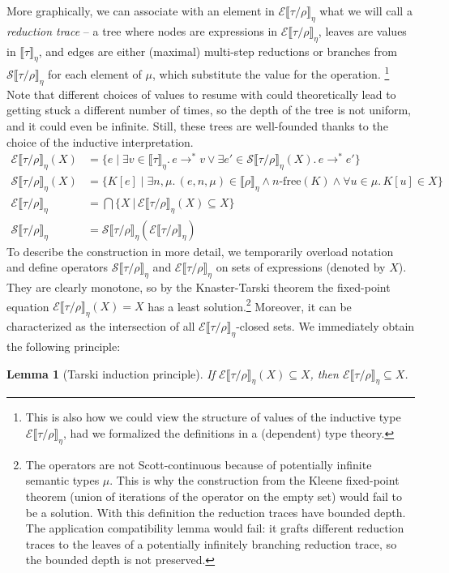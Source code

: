 \documentclass[a4paper, 12pt]{report}
\newcommand{\E}{\mathcal{E}}
\renewcommand{\S}{\mathcal{S}}
\newcommand{\Free}{\textrm{-}\mathrm{free}}
\newcommand{\+}{\enspace}
\newtheorem{lemma}{Lemma}
\begin{document}
More graphically,
we can associate with an element in $\E⟦τ/ρ⟧_η$ what we will call a {\em reduction trace}
– a tree where nodes are expressions in $\E⟦τ/ρ⟧_η$,
leaves are values in $⟦τ⟧_η$, and edges are either (maximal) multi-step reductions
or branches from $\S⟦τ/ρ⟧_η$ for each element of $μ$,
which substitute the value for the operation.%
\footnote{
	This is also how we could view the structure of values of the inductive type $\E⟦τ/ρ⟧_η$,
	had we formalized the definitions in a (dependent) type theory.
}
Note that different choices of values to resume with could
theoretically lead to getting stuck a different number of times,
so the depth of the tree is not uniform, and it could even be infinite.
Still, these trees are well-founded thanks to the choice of the inductive interpretation.
\begin{align*}
	\E⟦τ/ρ⟧_η(X) &=
	\{ e \mid ∃v∈⟦τ⟧_η.\, e →^* v ∨ ∃e'∈\S⟦τ/ρ⟧_η(X).\, e →^* e' \} \\
	\S⟦τ/ρ⟧_η(X) &= \{ K[e] \mid ∃n,μ.\, (e,n,μ)∈⟦ρ⟧_η  ∧ n\Free(K) ∧ ∀u∈μ.\, K[u]∈X \} \\
	\E⟦τ/ρ⟧_η &= \bigcap \{ X │ \E⟦τ/ρ⟧_η(X) ⊆ X \} \\
	\S⟦τ/ρ⟧_η &= \S⟦τ/ρ⟧_η(\E⟦τ/ρ⟧_η)
\end{align*} \indent
To describe the construction in more detail, we temporarily overload notation and define
operators $\S⟦τ/ρ⟧_η$ and $\E⟦τ/ρ⟧_η$ on sets of expressions (denoted by $X$).
They are clearly monotone,
so by the Knaster-Tarski theorem %
the fixed-point equation $\E⟦τ/ρ⟧_η(X) = X$ has a least solution.\footnote{
	The operators are not Scott-continuous because of potentially infinite semantic
	types $μ$.
	This is why the construction from the Kleene fixed-point theorem (union of
	iterations of the operator on the empty set)
	would fail to be a solution.
	With this definition the reduction traces have bounded depth.
	The application compatibility lemma would fail:
	it grafts different reduction traces to the leaves of a
	potentially infinitely branching reduction trace,
	so the bounded depth is not preserved.
}
Moreover, it can be characterized as the intersection of all
$\E⟦τ/ρ⟧_η$-closed sets.
We immediately obtain the following principle:

\begin{lemma}[Tarski induction principle]\label{tarski-induction}
	If $\E⟦τ/ρ⟧_η(X) ⊆ X$, then $\E⟦τ/ρ⟧_η ⊆ X$.
\end{lemma}
\end{document}
